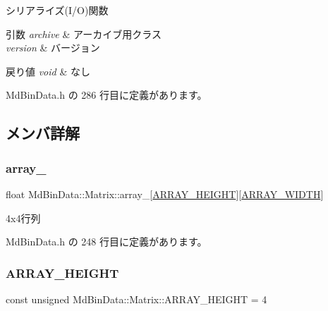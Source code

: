 シリアライズ(I/O)関数 


\begin{DoxyParams}{引数}
{\em archive} & アーカイブ用クラス \\
\hline
{\em version} & バージョン \\
\hline
\end{DoxyParams}

\begin{DoxyRetVals}{戻り値}
{\em void} & なし \\
\hline
\end{DoxyRetVals}


 Md\+Bin\+Data.\+h の 286 行目に定義があります。



\subsection{メンバ詳解}
\mbox{\label{class_md_bin_data_1_1_matrix_a9b13d72966bb7b35e1c5acbfef92095f}} 
\subsubsection{\texorpdfstring{array\+\_\+}{array\_}}
{\footnotesize\ttfamily float Md\+Bin\+Data\+::\+Matrix\+::array\+\_\+\mbox{[}\mbox{\hyperlink{class_md_bin_data_1_1_matrix_a69ea4171a8c2fbf1728396463bfd9bc8}{A\+R\+R\+A\+Y\+\_\+\+H\+E\+I\+G\+HT}}\mbox{]}\mbox{[}\mbox{\hyperlink{class_md_bin_data_1_1_matrix_adbf2f2e21df64ab4559b9c98b88a6c59}{A\+R\+R\+A\+Y\+\_\+\+W\+I\+D\+TH}}\mbox{]}\hspace{0.3cm}{\ttfamily [private]}}



4x4行列 



 Md\+Bin\+Data.\+h の 248 行目に定義があります。

\mbox{\label{class_md_bin_data_1_1_matrix_a69ea4171a8c2fbf1728396463bfd9bc8}} 
\subsubsection{\texorpdfstring{A\+R\+R\+A\+Y\+\_\+\+H\+E\+I\+G\+HT}{ARRAY\_HEIGHT}}
{\footnotesize\ttfamily const unsigned Md\+Bin\+Data\+::\+Matrix\+::\+A\+R\+R\+A\+Y\+\_\+\+H\+E\+I\+G\+HT = 4\hspace{0.3cm}{\ttfamily [static]}}



